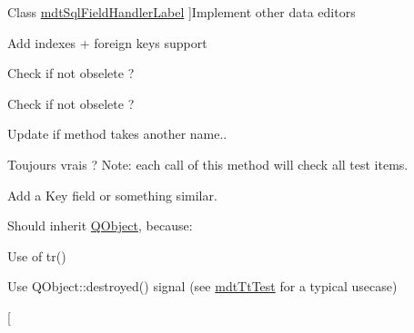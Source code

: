 \begin{DoxyRefList}
Class \hyperlink{classmdt_sql_field_handler_label}{mdt\-Sql\-Field\-Handler\-Label} ]Implement other data editors  
\item[\label{todo__todo000007}%
\hypertarget{todo__todo000007}{}%
Member \hyperlink{classmdt_sql_schema_table_a2cea444ccb26b0802fb230db5460e167}{mdt\-Sql\-Schema\-Table\-:\-:setup\-From\-Table} (const Q\-String \&name, Q\-Sql\-Database db)]Add indexes + foreign keys support  
\item[\label{todo__todo000100}%
\hypertarget{todo__todo000100}{}%
Class \hyperlink{classmdt_sql_table_model}{mdt\-Sql\-Table\-Model} ]Check if not obselete ?  
\item[\label{todo__todo000099}%
\hypertarget{todo__todo000099}{}%
Member \hyperlink{classmdt_sql_table_model_ad423c1b0c74ecbbb575637b028c2574b}{mdt\-Sql\-Table\-Model\-:\-:mdt\-Sql\-Table\-Model} (\hyperlink{class_q_object}{Q\-Object} $\ast$parent=0, Q\-Sql\-Database db=Q\-Sql\-Database())]Check if not obselete ?  
\item[\label{todo__todo000061}%
\hypertarget{todo__todo000061}{}%
Member \hyperlink{classmdt_tt_abstract_tester_a9cc3f5bfe9e27ac0ae376ea1c82e8585}{mdt\-Tt\-Abstract\-Tester\-:\-:set\-Test\-Ui\-Widget} (\hyperlink{class_q_widget}{Q\-Widget} $\ast$widget)]Update if method takes another name.. 
\item[\label{todo__todo000062}%
\hypertarget{todo__todo000062}{}%
Member \hyperlink{classmdt_tt_abstract_tester_af98bb9d80bfbd14873fc356c17d31eb4}{mdt\-Tt\-Abstract\-Tester\-:\-:test\-Is\-Saved} () const ]Toujours vrais ? Note\-: each call of this method will check all test items.  
\item[\label{todo__todo000063}%
\hypertarget{todo__todo000063}{}%
Member \hyperlink{classmdt_tt_abstract_test_node_calibration_tool_a85c47fe2b501769f5966a27aeb3f051a}{mdt\-Tt\-Abstract\-Test\-Node\-Calibration\-Tool\-:\-:set\-Test\-Node} (const Q\-Variant \&test\-Node\-Id)]Add a Key field or something similar.  
\item[\label{todo__todo000065}%
\hypertarget{todo__todo000065}{}%
Class \hyperlink{classmdt_tt_base}{mdt\-Tt\-Base} ]Should inherit \hyperlink{class_q_object}{Q\-Object}, because\-:
\begin{DoxyItemize}
\item Use of tr()
\item Use Q\-Object\-::destroyed() signal (see \hyperlink{classmdt_tt_test}{mdt\-Tt\-Test} for a typical usecase)  
\end{DoxyItemize}
\item[\label{todo__todo000064}%

\end{DoxyRefList}
